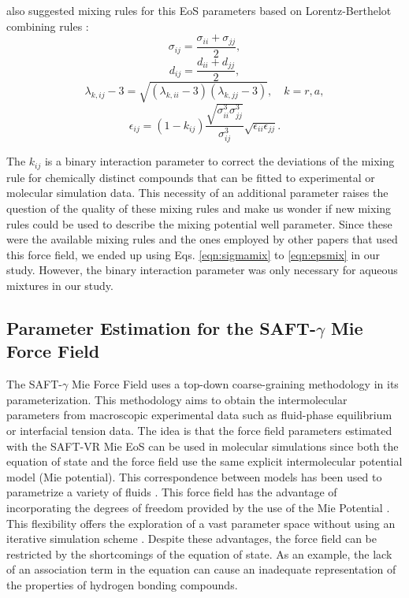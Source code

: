  also suggested mixing rules for this EoS parameters based on Lorentz-Berthelot combining rules \cite{rowlinson}:
\begin{equation}
\sigma_{ij} =\frac{\sigma_{ii}+\sigma_{jj}}{2},
\label{eqn:sigmamix}
\end{equation}
\begin{equation}
d_{ij} =\frac{d_{ii}+d_{jj}}{2},
\label{eqn:dmix}
\end{equation}
\begin{equation}
\lambda_{k,ij} -3 =\sqrt{(\lambda_{k,ii}-3)(\lambda_{k,jj}-3)},  \quad k=r,a,
\label{eqn:lambdamix}
\end{equation}
\begin{equation}
\epsilon_{ij} =(1-k_{ij})\frac{\sqrt{\sigma_{ii}^{3}\sigma_{jj}^{3}}}{\sigma_{ij}^{3}}\sqrt{\epsilon_{ii}\epsilon_{jj}}.
\label{eqn:epsmix}
\end{equation}

The $k_{ij}$ is a binary interaction parameter to correct the deviations of the mixing rule for chemically distinct compounds that can be fitted to experimental or molecular simulation data. This necessity of an additional parameter raises the question of the quality of these mixing rules and make us wonder if new mixing rules could be used to describe the mixing potential well parameter. Since these were the available mixing rules and the ones employed by other papers that used this force field, we ended up using Eqs. \ref{eqn:sigmamix} to \ref{eqn:epsmix} in our study. However, the binary interaction parameter was only necessary for aqueous mixtures in our study.  


\subsection{Parameter Estimation for the SAFT-$\gamma$ Mie Force Field}\label{parsaft}

The SAFT-$\gamma$ Mie Force Field uses a top-down coarse-graining methodology in its parameterization. This methodology aims to obtain the intermolecular parameters from macroscopic experimental data such as fluid-phase equilibrium or interfacial tension data. The idea is that the force field parameters estimated with the SAFT-VR Mie EoS can be used in molecular simulations since both the equation of state and the force field use the same explicit intermolecular potential model (Mie potential). This correspondence between models has been used to parametrize a variety of fluids \cite{ervik2016}. This force field has the advantage of incorporating the degrees of freedom provided by the use of the Mie Potential \cite{herdes2015}. This flexibility offers the exploration of a vast parameter space without using an iterative simulation scheme \cite{avendano2011}. Despite these advantages, the force field can be restricted by the shortcomings of the equation of state. As an example, the lack of an association term in the equation can cause an inadequate representation of the properties of hydrogen bonding compounds.

